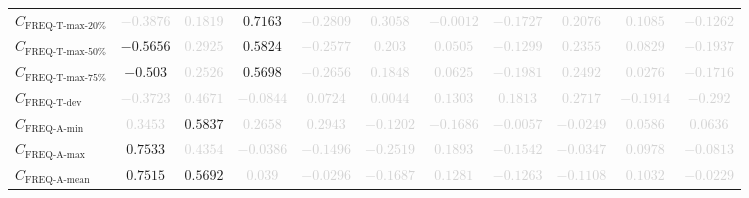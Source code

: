 \documentclass{standalone}
\newcommand{\freqmaxtwentyname}{\text{FREQ-T-max-20\%}}
\newcommand{\freqmaxtwenty}{C_{\freqmaxtwentyname}}
\newcommand{\freqmaxfiftyname}{\text{FREQ-T-max-50\%}}
\newcommand{\freqmaxfifty}{C_{\freqmaxfiftyname}}
\newcommand{\freqmaxseventyfivename}{\text{FREQ-T-max-75\%}}
\newcommand{\freqmaxseventyfive}{C_{\freqmaxseventyfivename}}
\newcommand{\freqdevname}{\text{FREQ-T-dev}}
\newcommand{\freqdev}{C_{\freqdevname}}
\newcommand{\actfreqminname}{\text{FREQ-A-min}}
\newcommand{\actfreqmin}{C_{\actfreqminname}}
\newcommand{\actfreqmaxname}{\text{FREQ-A-max}}
\newcommand{\actfreqmax}{C_{\actfreqmaxname}}
\newcommand{\actfreqmeanname}{\text{FREQ-A-mean}}
\newcommand{\actfreqmean}{C_{\actfreqmeanname}}
\begin{document}
\begin{tabular}{lcccccccccc}
$\freqmaxtwenty$ & \textcolor{lightgray}{$-0.3876$} & \textcolor{lightgray}{$0.1819$} & $0.7163$ & \textcolor{lightgray}{$-0.2809$} & \textcolor{lightgray}{$0.3058$} & \textcolor{lightgray}{$-0.0012$} & \textcolor{lightgray}{$-0.1727$} & \textcolor{lightgray}{$0.2076$} & \textcolor{lightgray}{$0.1085$} & \textcolor{lightgray}{$-0.1262$} \\ 
$\freqmaxfifty$ & $-0.5656$ & \textcolor{lightgray}{$0.2925$} & $0.5824$ & \textcolor{lightgray}{$-0.2577$} & \textcolor{lightgray}{$0.203$} & \textcolor{lightgray}{$0.0505$} & \textcolor{lightgray}{$-0.1299$} & \textcolor{lightgray}{$0.2355$} & \textcolor{lightgray}{$0.0829$} & \textcolor{lightgray}{$-0.1937$} \\ 
$\freqmaxseventyfive$ & $-0.503$ & \textcolor{lightgray}{$0.2526$} & $0.5698$ & \textcolor{lightgray}{$-0.2656$} & \textcolor{lightgray}{$0.1848$} & \textcolor{lightgray}{$0.0625$} & \textcolor{lightgray}{$-0.1981$} & \textcolor{lightgray}{$0.2492$} & \textcolor{lightgray}{$0.0276$} & \textcolor{lightgray}{$-0.1716$} \\ 
$\freqdev$ & \textcolor{lightgray}{$-0.3723$} & \textcolor{lightgray}{$0.4671$} & \textcolor{lightgray}{$-0.0844$} & \textcolor{lightgray}{$0.0724$} & \textcolor{lightgray}{$0.0044$} & \textcolor{lightgray}{$0.1303$} & \textcolor{lightgray}{$0.1813$} & \textcolor{lightgray}{$0.2717$} & \textcolor{lightgray}{$-0.1914$} & \textcolor{lightgray}{$-0.292$} \\ 
$\actfreqmin$ & \textcolor{lightgray}{$0.3453$} & $0.5837$ & \textcolor{lightgray}{$0.2658$} & \textcolor{lightgray}{$0.2943$} & \textcolor{lightgray}{$-0.1202$} & \textcolor{lightgray}{$-0.1686$} & \textcolor{lightgray}{$-0.0057$} & \textcolor{lightgray}{$-0.0249$} & \textcolor{lightgray}{$0.0586$} & \textcolor{lightgray}{$0.0636$} \\ 
$\actfreqmax$ & $0.7533$ & \textcolor{lightgray}{$0.4354$} & \textcolor{lightgray}{$-0.0386$} & \textcolor{lightgray}{$-0.1496$} & \textcolor{lightgray}{$-0.2519$} & \textcolor{lightgray}{$0.1893$} & \textcolor{lightgray}{$-0.1542$} & \textcolor{lightgray}{$-0.0347$} & \textcolor{lightgray}{$0.0978$} & \textcolor{lightgray}{$-0.0813$} \\ 
$\actfreqmean$ & $0.7515$ & $0.5692$ & \textcolor{lightgray}{$0.039$} & \textcolor{lightgray}{$-0.0296$} & \textcolor{lightgray}{$-0.1687$} & \textcolor{lightgray}{$0.1281$} & \textcolor{lightgray}{$-0.1263$} & \textcolor{lightgray}{$-0.1108$} & \textcolor{lightgray}{$0.1032$} & \textcolor{lightgray}{$-0.0229$} \\ 

\end{tabular}
\end{document}
